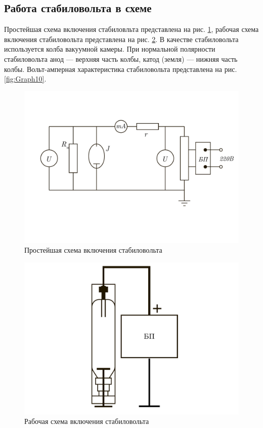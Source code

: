 \documentclass[a4paper, 12pt]{article}
\begin{document}
	\subsection{Работа стабиловольта в схеме}
	Простейшая схема включения стабиловльта представлена на рис. \ref{fig:Graph8}, рабочая схема включения стабиловольта представлена на рис. \ref{fig:Graph9}. В качестве стабиловольта используется колба вакуумной камеры. При нормальной полярности стабиловольта анод — верхняя часть колбы, катод (земля) — нижняя часть колбы. Вольт-амперная характеристика стабиловольта представлена на рис. \ref{fig:Graph10}.
	\begin{figure}[h]
		\centering
		\includegraphics[scale=0.4]{Graph8.pdf}
		\caption{Простейшая схема включения стабиловольта}
		\label{fig:Graph8}
	\end{figure}
	\begin{figure}[h]
		\centering
		\includegraphics[scale=0.4]{Graph9.pdf}
		\caption{Рабочая схема включения стабиловольта}
		\label{fig:Graph9}
	\end{figure}
\end{document}
